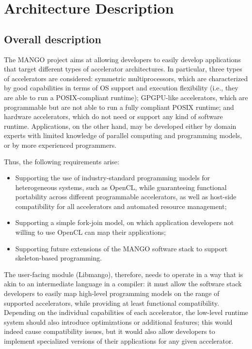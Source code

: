 \chapter{Architecture Description}

\section{Overall description}

The MANGO project aims at allowing developers to easily develop applications that target different types of accelerator architectures. In particular,  three types of accelerators are considered: symmetric multiprocessors, which are characterized by good capabilities in terms of OS support and execution flexibility (i.e., they are able to run a POSIX-compliant runtime); GPGPU-like accelerators, which are programmable but are not able to run a fully compliant POSIX runtime; and hardware accelerators, which do not need or support any kind  of software runtime. Applications, on the other hand, may be developed either by domain experts with limited knowledge of parallel computing and programming models, or by more experienced programmers. 

Thus, the following requirements arise:
\begin{itemize}
    \item 
    Supporting the use of industry-standard programming models for heterogeneous systems, such as OpenCL, while guaranteeing functional portability across different programmable accelerators, as well as host-side compatibility for all accelerators and automated resource management;
    \item 
    Supporting a simple fork-join model, on which application developers not willing to use OpenCL can map their applications;
    \item
    Supporting future extensions of the MANGO software stack to support skeleton-based programming.
\end{itemize}

The user-facing module (Libmango), therefore, needs to operate in a way that is akin to an intermediate language in a compiler: it must allow the software stack developers to easily map high-level programming models on the range of supported accelerators, while providing at least functional compatibility. Depending on the individual capabilities of each accelerator, the low-level runtime system should also introduce optimizations or additional features; this would indeed cause compatibility issues, but it would also allow developers to implement specialized versions of their applications for any given accelerator. \cite{mango_exploring_manycore_architectures}

